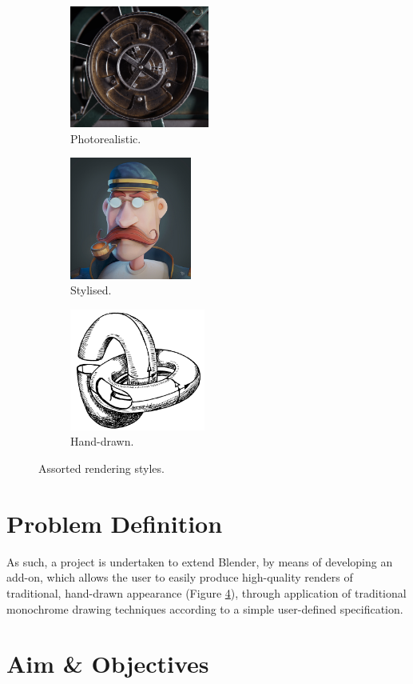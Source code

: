 \begin{figure}[h]
	\centering
	\begin{subfigure}[b]{0.3\textwidth}
		\includegraphics[height=4cm]{images/ex_photoreal}
		\caption{Photorealistic.}\label{ex_photoreal}
	\end{subfigure}
	\begin{subfigure}[b]{0.3\textwidth}
		\includegraphics[height=4cm]{images/ex_stylised}
		\caption{Stylised.}\label{ex_stylised}
	\end{subfigure}
	\begin{subfigure}[b]{0.3\textwidth}
		\includegraphics[height=4cm]{images/ex_hand_drawn}
		\caption{Hand-drawn.}\label{ex_hand_drawn}
	\end{subfigure}
	\caption{Assorted rendering styles.\protect\footnotemark}
\end{figure}

\section{Problem Definition}

As such, a project is undertaken to extend Blender, by means of developing an add-on, which allows the user to easily produce high-quality renders of traditional, hand-drawn appearance (Figure \ref{ex_hand_drawn}), through application of traditional monochrome drawing techniques according to a simple user-defined specification.

\section{Aim \& Objectives}
% 



